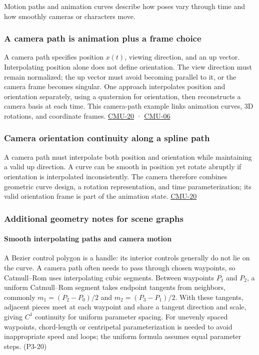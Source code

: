Motion paths and animation curves describe how poses vary through time and how smoothly cameras or characters move.

\subsubsection{A camera path is animation plus a frame choice}\label{a-camera-path-is-animation-plus-a-frame-choice}

A camera path specifies position \(x(t)\), viewing direction, and an up vector. Interpolating position alone does not define orientation. The view direction must remain normalized; the up vector must avoid becoming parallel to it, or the camera frame becomes singular. One approach interpolates position and orientation separately, using a quaternion for orientation, then reconstructs a camera basis at each time. This camera-path example links animation curves, 3D rotations, and coordinate frames. \hyperref[04-visual-computing-ii-ch036]{CMU-20} · \hyperref[04-visual-computing-ii-ch036]{CMU-06}

\subsubsection{Camera orientation continuity along a spline path}\label{camera-orientation-continuity-along-a-spline-path}

A camera path must interpolate both position and orientation while maintaining a valid up direction. A curve can be smooth in position yet rotate abruptly if orientation is interpolated inconsistently. The camera therefore combines geometric curve design, a rotation representation, and time parameterization; its valid orientation frame is part of the animation state. \hyperref[04-visual-computing-ii-ch036]{CMU-20}

\subsubsection{Additional geometry notes for scene graphs}\label{additional-geometry-notes-for-scene-graphs}

\paragraph{Smooth interpolating paths and camera motion}\label{smooth-interpolating-paths-and-camera-motion}

A Bezier control polygon is a handle: its interior controls generally do not lie on the curve. A camera path often needs to pass through chosen waypoints, so Catmull--Rom uses interpolating cubic segments. Between waypoints \(P_1\) and \(P_2\), a uniform Catmull--Rom segment takes endpoint tangents from neighbors, commonly \(m_1=(P_2-P_0)/2\) and \(m_2=(P_3-P_1)/2\). With these tangents, adjacent pieces meet at each waypoint and share a tangent direction and scale, giving \(C^1\) continuity for uniform parameter spacing. For unevenly spaced waypoints, chord-length or centripetal parameterization is needed to avoid inappropriate speed and loops; the uniform formula assumes equal parameter steps. (P3-20)

